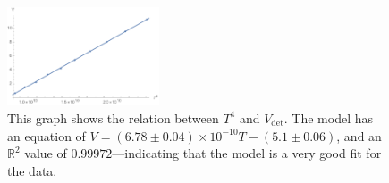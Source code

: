 \documentclass[%
 reprint,
superscriptaddress,
 amsmath,amssymb,
 aps,
]{revtex4-1}
\newcommand{\R}{\mathbb{R}}
\begin{document}
\begin{figure}
    \includegraphics[width=0.4\textwidth]{floats/lowtemp-graph}
    \caption{This graph shows the relation between $T^4$ and $V_{\text{det}}$. The model has an equation of $V = (6.78\pm0.04)\times10^{-10} T - (5.1\pm0.06)$, and an $\R^2$ value of $0.99972$---indicating that the model is a very good fit for the data.}
    \label{ltgraph}
\end{figure}
\end{document}
